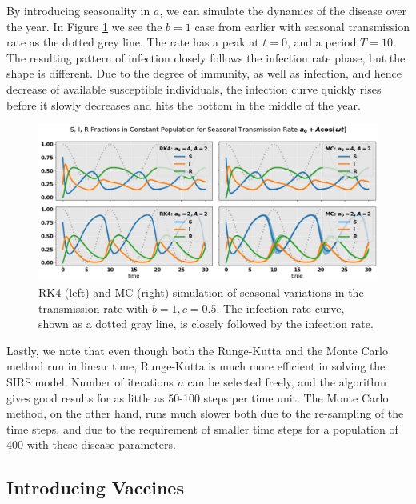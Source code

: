 \documentclass[]{article}
\begin{document}
By introducing seasonality in $a$, we can simulate the dynamics of the disease over the year. In Figure \ref{fig:seasonal-transmission-rate} we see the $b=1$ case from earlier with seasonal transmission rate as the dotted grey line. The rate has a peak at $t=0$, and a period $T=10$. The resulting pattern of infection closely follows the infection rate phase, but the shape is different. Due to the degree of immunity, as well as infection, and hence decrease of available susceptible individuals, the infection curve quickly rises before it slowly decreases and hits the bottom in the middle of the year.

\begin{figure}[!h]
	\centering
	\includegraphics[width=1\linewidth]{./figs/seasonal-transmission-rate.png}
	\caption{RK4 (left) and MC (right) simulation of seasonal variations in the transmission rate with $b=1, c=0.5$. The infection rate curve, shown as a dotted gray line, is closely followed by the infection rate.}
	\label{fig:seasonal-transmission-rate}
\end{figure}

Lastly, we note that even though both the Runge-Kutta and the Monte Carlo method run in linear time, Runge-Kutta is much more efficient in solving the SIRS model. Number of iterations $n$ can be selected freely, and the algorithm gives good results for as little as 50-100 steps per time unit. The Monte Carlo method, on the other hand, runs much slower both due to the re-sampling of the time steps, and due to the requirement of smaller time steps for a population of 400 with these disease parameters.

\subsection{Introducing Vaccines} \label{sec:vaccines}
\end{document}
